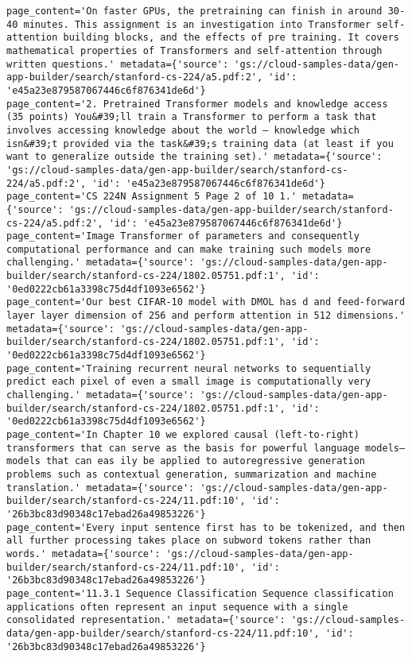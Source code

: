 \documentclass[
  letterpaper,
  DIV=11,
  numbers=noendperiod]{scrreprt}
\begin{document}
\begin{verbatim}
page_content='On faster GPUs, the pretraining can finish in around 30-40 minutes. This assignment is an investigation into Transformer self-attention building blocks, and the effects of pre training. It covers mathematical properties of Transformers and self-attention through written questions.' metadata={'source': 'gs://cloud-samples-data/gen-app-builder/search/stanford-cs-224/a5.pdf:2', 'id': 'e45a23e879587067446c6f876341de6d'}
page_content='2. Pretrained Transformer models and knowledge access (35 points) You&#39;ll train a Transformer to perform a task that involves accessing knowledge about the world — knowledge which isn&#39;t provided via the task&#39;s training data (at least if you want to generalize outside the training set).' metadata={'source': 'gs://cloud-samples-data/gen-app-builder/search/stanford-cs-224/a5.pdf:2', 'id': 'e45a23e879587067446c6f876341de6d'}
page_content='CS 224N Assignment 5 Page 2 of 10 1.' metadata={'source': 'gs://cloud-samples-data/gen-app-builder/search/stanford-cs-224/a5.pdf:2', 'id': 'e45a23e879587067446c6f876341de6d'}
page_content='Image Transformer of parameters and consequently computational performance and can make training such models more challenging.' metadata={'source': 'gs://cloud-samples-data/gen-app-builder/search/stanford-cs-224/1802.05751.pdf:1', 'id': '0ed0222cb61a3398c75d4df1093e6562'}
page_content='Our best CIFAR-10 model with DMOL has d and feed-forward layer layer dimension of 256 and perform attention in 512 dimensions.' metadata={'source': 'gs://cloud-samples-data/gen-app-builder/search/stanford-cs-224/1802.05751.pdf:1', 'id': '0ed0222cb61a3398c75d4df1093e6562'}
page_content='Training recurrent neural networks to sequentially predict each pixel of even a small image is computationally very challenging.' metadata={'source': 'gs://cloud-samples-data/gen-app-builder/search/stanford-cs-224/1802.05751.pdf:1', 'id': '0ed0222cb61a3398c75d4df1093e6562'}
page_content='In Chapter 10 we explored causal (left-to-right) transformers that can serve as the basis for powerful language models—models that can eas ily be applied to autoregressive generation problems such as contextual generation, summarization and machine translation.' metadata={'source': 'gs://cloud-samples-data/gen-app-builder/search/stanford-cs-224/11.pdf:10', 'id': '26b3bc83d90348c17ebad26a49853226'}
page_content='Every input sentence first has to be tokenized, and then all further processing takes place on subword tokens rather than words.' metadata={'source': 'gs://cloud-samples-data/gen-app-builder/search/stanford-cs-224/11.pdf:10', 'id': '26b3bc83d90348c17ebad26a49853226'}
page_content='11.3.1 Sequence Classification Sequence classification applications often represent an input sequence with a single consolidated representation.' metadata={'source': 'gs://cloud-samples-data/gen-app-builder/search/stanford-cs-224/11.pdf:10', 'id': '26b3bc83d90348c17ebad26a49853226'}
\end{verbatim}
\end{document}
